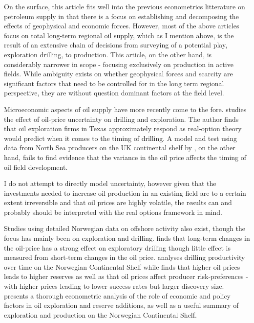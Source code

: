 \documentclass[12pt]{article}
\begin{document}
On the surface, this article fits well into the previous econometrics litterature on petroleum supply in that there is a focus on establishing and decomposing the effects of geophysical and economic forces. However, most of the above articles focus on total long-term regional oil supply, which as I mention above, is the result of an extensive chain of decisions from surveying of a potential play, exploration drilling, to production. This article, on the other hand, is considerably narrower in scope - focusing exclusively on production in active fields. While ambiguity exists on whether geophysical forces and scarcity are significant factors that need to be controlled for in the long term regional perspective, they are without question dominant factors at the field level.

Microeconomic aspects of oil supply have more recently come to the fore. \citet{kellogg_effect_2014} studies the effect of oil-price uncertainty on drilling and exploration. The author finds that oil exploration firms in Texas approximately respond as real-option theory would predict when it comes to the timing of drilling.  A model and test using data from North Sea producers on the UK continental shelf by \citet{hurn_geology_1994}, on the other hand, fails to find evidence that the variance in the oil price affects the timing of oil field development.  

I do not attempt to directly model uncertainty, however given that the investments needed to increase oil production in an existing field are to a certain extent irreversible and that oil prices are highly volatile, the results can and probably should be interpreted with the real options framework in mind.  

Studies using detailed Norwegian data on offshore activity also exist, though the focus has mainly been on exploration and drilling.  \citet{mohn_exploration_2008} finds that long-term changes in the oil-price has a strong effect on exploratory drilling though little effect is measured from short-term changes in the oil price. \citet{osmundsen_exploration_2010} analyses drilling productivity over time on the Norwegian Continental Shelf while \citet{mohn_efforts_2008} finds that higher oil prices leads to higher reserves as well as that oil prices affect producer risk-preferences - with higher prices leading to lower success rates but larger discovery size. \citet{mohn_elastic_2010} presents a thorough econometric analysis of the role of economic and policy factors in oil exploration and reserve additions, as well as a useful summary of exploration and production on the Norwegian Continental Shelf.
\end{document}
